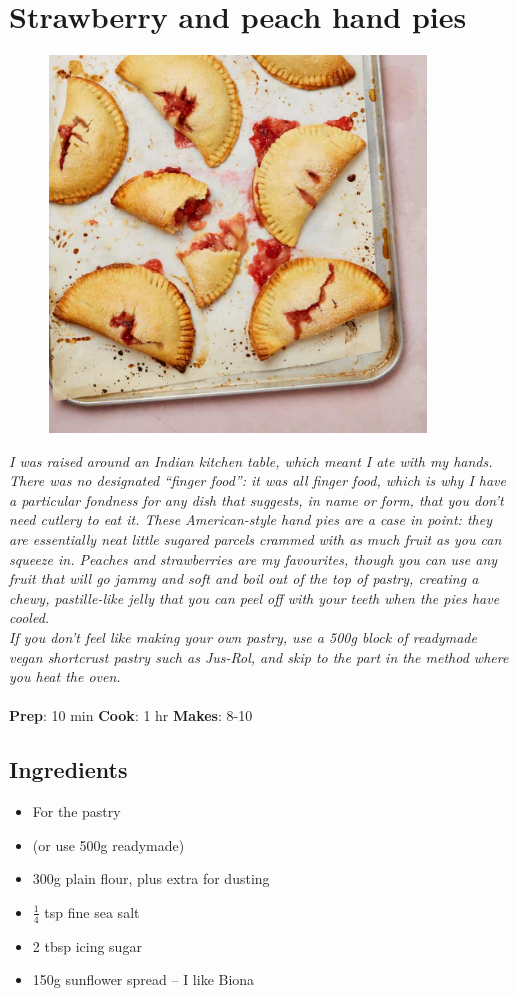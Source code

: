 \documentclass{book}
\begin{document}
\section{Strawberry and peach hand pies}
\begin{figure}
\centering\includegraphics[width=10cm,height=10cm,keepaspectratio]{Recipe_Pictures/Strawberry_and_peach_hand_pies.png}
\end{figure}
\emph{I was raised around an Indian kitchen table, which meant I ate with my hands. There was no designated “finger food”: it was all finger food, which is why I have a particular fondness for any dish that suggests, in name or form, that you don’t need cutlery to eat it. These American-style hand pies are a case in point: they are essentially neat little sugared parcels crammed with as much fruit as you can squeeze in. Peaches and strawberries are my favourites, though you can use any fruit that will go jammy and soft and boil out of the top of pastry, creating a chewy, pastille-like jelly that you can peel off with your teeth when the pies have cooled.\\ 
If you don’t feel like making your own pastry, use a 500g block of readymade vegan shortcrust pastry such as Jus-Rol, and skip to the part in the method where you heat the oven.}\\\\ 
\textbf{Prep}: 10 min
\textbf{Cook}: 1 hr
\textbf{Makes}: 8-10
\subsection*{Ingredients}
\begin{itemize}
\item For the pastry 
\item (or use 500g readymade)
\item 300g plain flour, plus extra for dusting 
\item $\frac{1}{4}$ tsp fine sea salt
\item 2 tbsp icing sugar
\item 150g sunflower spread – I like Biona
\end{itemize}
\end{document}
